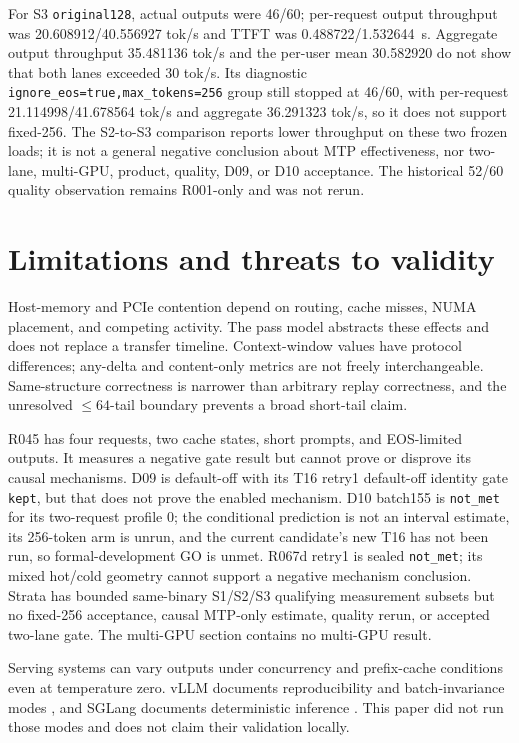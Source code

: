 \documentclass[11pt]{article}
\begin{document}
For S3 \texttt{original128}, actual outputs were 46/60; per-request output throughput was 20.608912/40.556927 tok/s and TTFT was 0.488722/1.532644~s. Aggregate output throughput 35.481136 tok/s and the per-user mean 30.582920 do not show that both lanes exceeded 30 tok/s. Its diagnostic \texttt{ignore\_eos=true,max\_tokens=256} group still stopped at 46/60, with per-request 21.114998/41.678564 tok/s and aggregate 36.291323 tok/s, so it does not support fixed-256. The S2-to-S3 comparison reports lower throughput on these two frozen loads; it is not a general negative conclusion about MTP effectiveness, nor two-lane, multi-GPU, product, quality, D09, or D10 acceptance. The historical 52/60 quality observation remains R001-only and was not rerun.

\section{Limitations and threats to validity}

Host-memory and PCIe contention depend on routing, cache misses, NUMA placement, and competing activity. The pass model abstracts these effects and does not replace a transfer timeline. Context-window values have protocol differences; any-delta and content-only metrics are not freely interchangeable. Same-structure correctness is narrower than arbitrary replay correctness, and the unresolved $\leq64$-tail boundary prevents a broad short-tail claim.

R045 has four requests, two cache states, short prompts, and EOS-limited outputs. It measures a negative gate result but cannot prove or disprove its causal mechanisms. D09 is default-off with its T16 retry1 default-off identity gate \texttt{kept}, but that does not prove the enabled mechanism. D10 batch155 is \texttt{not\_met} for its two-request profile 0; the conditional prediction is not an interval estimate, its 256-token arm is unrun, and the current candidate's new T16 has not been run, so formal-development GO is unmet. R067d retry1 is sealed \texttt{not\_met}; its mixed hot/cold geometry cannot support a negative mechanism conclusion. Strata has bounded same-binary S1/S2/S3 qualifying measurement subsets but no fixed-256 acceptance, causal MTP-only estimate, quality rerun, or accepted two-lane gate. The multi-GPU section contains no multi-GPU result.

Serving systems can vary outputs under concurrency and prefix-cache conditions even at temperature zero. vLLM documents reproducibility and batch-invariance modes \cite{vllmrepro,vllmbatch}, and SGLang documents deterministic inference \cite{sglang}. This paper did not run those modes and does not claim their validation locally.
\end{document}
